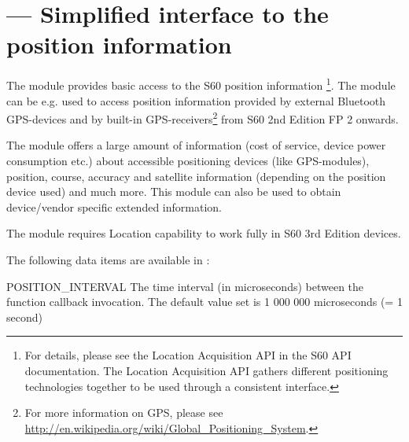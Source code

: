 %
%
%


\section{ ---
         Simplified interface to the position information}
\label{sec:position}


The  module provides basic access to the S60 position 
information \footnote{For details, please see the Location Acquisition API in 
the S60 API documentation. The Location Acquisition API gathers different 
positioning technologies together to be used through a consistent interface.}. 
The module can be e.g. used to access position information provided by external 
Bluetooth GPS-devices and by built-in GPS-receivers\footnote{For more 
information on GPS, please see 
\url{http://en.wikipedia.org/wiki/Global_Positioning_System}.} from S60 2nd 
Edition FP 2 onwards.

The module offers a large amount of information (cost of service, device power 
consumption etc.) about accessible positioning devices (like GPS-modules), 
position, course, accuracy and satellite information (depending on the position 
device used) and much more. This module can also be used to obtain device/vendor 
specific extended information.

\begin{notice}[note]
The  module  requires Location capability to work fully in S60 
3rd Edition devices.
\end{notice}

The following data items are available in :

\begin{datadesc}{POSITION_INTERVAL}
The time interval (in microseconds) between the  function 
callback invocation. The default value set is 1 000 000 microseconds (= 1 
second)
\end{datadesc}

